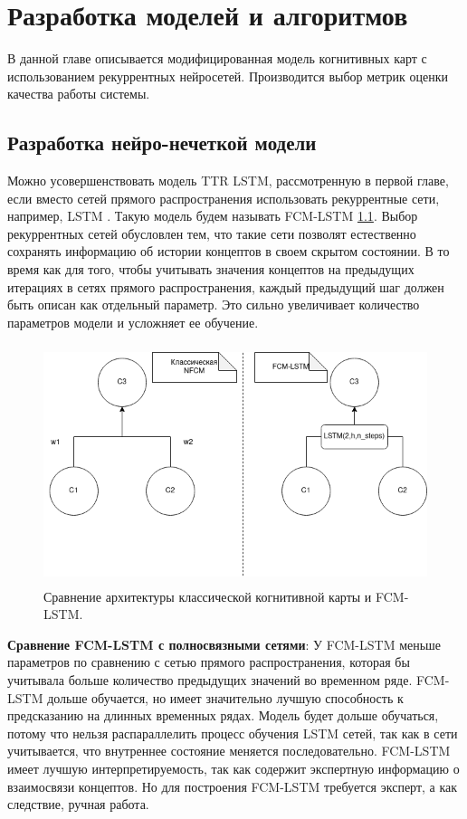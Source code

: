 \chapter{Разработка моделей и алгоритмов}

В данной главе описывается модифицированная модель
когнитивных карт с использованием рекуррентных нейросетей.
Производится выбор метрик оценки качества работы системы.

\section{Разработка нейро-нечеткой модели}

Можно усовершенствовать модель TTR LSTM, рассмотренную в первой главе,
если вместо сетей прямого распространения использовать рекуррентные сети,
например, LSTM \cite{LSTM_paper}. Такую модель будем называть FCM-LSTM \ref{img:nfcm_compare_with_classif_fcm}.
Выбор рекуррентных сетей обусловлен тем, что такие сети позволят естественно сохранять информацию об
истории концептов в своем скрытом состоянии. В то время как для
того, чтобы учитывать значения концептов на предыдущих итерациях
в сетях прямого распространения, каждый предыдущий шаг должен быть
описан как отдельный параметр. Это сильно увеличивает количество параметров
модели и усложняет ее обучение.

\def\figurename{Рис}
\begin{figure}[t]
	\centering
	\includegraphics[height=7cm]{./img/fcm_lstm_scheme.png}
	\caption{Сравнение архитектуры классической когнитивной карты и FCM-LSTM. }
	\label{img:nfcm_compare_with_classif_fcm}
\end{figure}

\textbf{Сравнение FCM-LSTM с полносвязными сетями}:
У FCM-LSTM меньше параметров по сравнению с сетью прямого распространения,
которая бы учитывала больше количество предыдущих значений во временном ряде.
FCM-LSTM дольше обучается, но имеет значительно лучшую способность к предсказанию
на длинных временных рядах.
Модель будет дольше обучаться, потому что нельзя распараллелить
процесс обучения LSTM сетей, так как в сети учитывается, что внутреннее состояние меняется последовательно.
FCM-LSTM имеет лучшую интерпретируемость, так как содержит
экспертную информацию о взаимосвязи концептов.
Но для построения FCM-LSTM требуется эксперт, а как следствие,
ручная работа.

